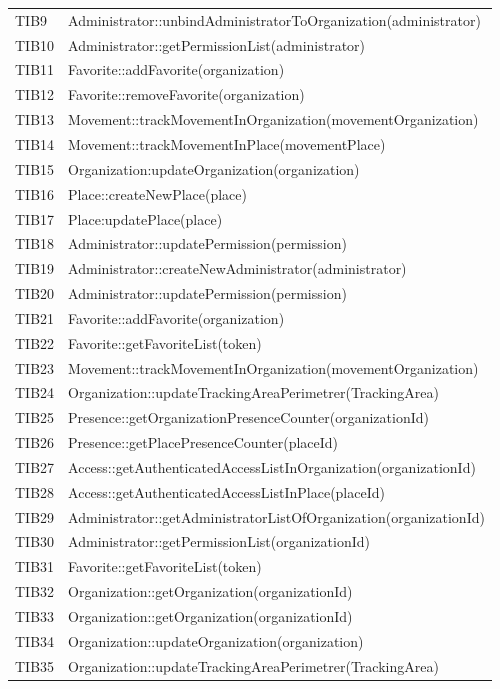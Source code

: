 {\begin{longtable}{C{2cm} C{12cm}}
	TIB9 & Administrator::unbindAdministratorToOrganization(administrator) \\
	TIB10 & Administrator::getPermissionList(administrator)\\
	TIB11 & Favorite::addFavorite(organization) \\
	TIB12 & Favorite::removeFavorite(organization) \\
	TIB13 & Movement::trackMovementInOrganization(movementOrganization)\\
	TIB14 & Movement::trackMovementInPlace(movementPlace) \\
	TIB15 & Organization:updateOrganization(organization) \\
	TIB16 & Place::createNewPlace(place) \\
	TIB17 & Place:updatePlace(place) \\
	TIB18 & Administrator::updatePermission(permission) \\
	TIB19 & Administrator::createNewAdministrator(administrator) \\
	TIB20 & Administrator::updatePermission(permission)\\
	TIB21 & Favorite::addFavorite(organization) \\
	TIB22 & Favorite::getFavoriteList(token) \\
	TIB23 & Movement::trackMovementInOrganization(movementOrganization) \\
	TIB24 & Organization::updateTrackingAreaPerimetrer(TrackingArea) \\
	TIB25 & Presence::getOrganizationPresenceCounter(organizationId) \\
	TIB26 & Presence::getPlacePresenceCounter(placeId) \\
	TIB27 & Access::getAuthenticatedAccessListInOrganization(organizationId) \\
	TIB28 & Access::getAuthenticatedAccessListInPlace(placeId) \\
	TIB29 & Administrator::getAdministratorListOfOrganization(organizationId) \\
	TIB30 & Administrator::getPermissionList(organizationId) \\
	TIB31 & Favorite::getFavoriteList(token) \\
	TIB32 & Organization::getOrganization(organizationId) \\
	TIB33 & Organization::getOrganization(organizationId) \\
	TIB34 & Organization::updateOrganization(organization) \\
	TIB35 & Organization::updateTrackingAreaPerimetrer(TrackingArea) \\

\end{longtable}}
